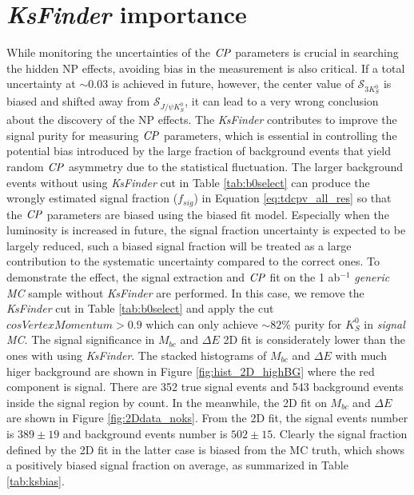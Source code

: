 \section{\textit{KsFinder} importance}
While monitoring the uncertainties of the $\it{CP}$ parameters is crucial in searching the hidden NP effects, avoiding bias in the measurement is also critical. If a total uncertainty at $\sim 0.03$ is achieved in future, however, the center value of $\mathcal{S}_{3K_S^0}$ is biased and shifted away from $\mathcal{S}_{J/\psi K_S^0}$, it can lead to a very wrong conclusion about the discovery of the NP effects.
The \textit{KsFinder} contributes to improve the signal purity for measuring $\it{CP}$ parameters, which is essential in controlling the potential bias introduced by the large fraction of background events that yield random $\it{CP}$ asymmetry due to the statistical fluctuation. The larger background events without using \textit{KsFinder} cut in Table \ref{tab:b0select} can produce the wrongly estimated signal fraction ($f_{sig}$) in Equation \ref{eq:tdcpv_all_res} so that the $\it{CP}$ parameters are biased using the biased fit model. Especially when the luminosity is increased in future, the signal fraction uncertainty is expected to be largely reduced, such a biased signal fraction will be treated as a large contribution to the systematic uncertainty compared to the correct ones. 
To demonstrate the effect,  the signal extraction and $\it{CP}$ fit on the 1 ab$^{-1}$ \textit{generic MC} sample without \textit{KsFinder} are performed. In this case, we remove the \textit{KsFinder} cut in Table \ref{tab:b0select} and apply the cut $cosVertexMomentum > 0.9$ which can only achieve $\sim 82\%$ purity for $K_S^0$ in \textit{signal MC}. The signal significance in $M_{bc}$ and $\Delta E$ 2D fit is considerately lower than the ones with using \textit{KsFinder}. The stacked histograms of $M_{bc}$ and $\Delta E$ with much higer background are shown in Figure \ref{fig:hist_2D_highBG} where the red component is signal. There are 352 true signal events and 543 background events inside the signal region by count. In the meanwhile, the 2D fit on $M_{bc}$ and $\Delta E$ are shown in Figure \ref{fig:2Ddata_noks}. From the 2D fit, the signal events number is $389\pm19$ and background events number is $502\pm15$. Clearly the signal fraction defined by the 2D fit in the latter case is biased from the MC truth, which shows a positively biased signal fraction on average, as summarized in Table \ref{tab:ksbias}.


